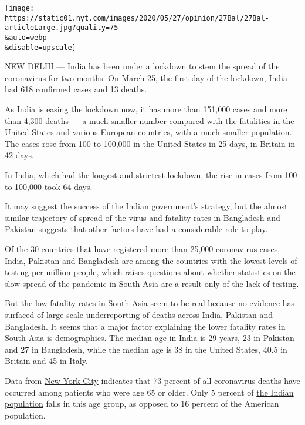 \texttt{[image: https://static01.nyt.com/images/2020/05/27/opinion/27Bal/27Bal-articleLarge.jpg?quality=75\\\&auto=webp\\\&disable=upscale]}

NEW DELHI --- India has been under a lockdown to stem the spread of the
coronavirus for two months. On March 25, the first day of the lockdown,
India had
\href{https://www.thehindu.com/news/national/india-coronavirus-lockdown-day-1-updates-march-25-2020/article31159466.ece}{618
confirmed cases} and 13 deaths.

As India is easing the lockdown now, it has
\href{https://www.livemint.com/news/india/coronavirus-update-covid-19-cases-in-india-surge-to-1-45-lakh-over-6-500-new-cases-in-last-24-hours-11590462824986.html}{more
than 151,000 cases} and more than 4,300 deaths --- a much smaller number
compared with the fatalities in the United States and various European
countries, with a much smaller population. The cases rose from 100 to
100,000 in the United States in 25 days, in Britain in 42 days.

In India, which had the longest and
\href{https://timesofindia.indiatimes.com/india/covid-19-cases-in-india-climbed-to-1-lakh-from-100-in-64-days/articleshow/75820314.cms}{strictest
lockdown}, the rise in cases from 100 to 100,000 took 64 days.

It may suggest the success of the Indian government's strategy, but the
almost similar trajectory of spread of the virus and fatality rates in
Bangladesh and Pakistan suggests that other factors have had a
considerable role to play.

Of the 30 countries that have registered more than 25,000 coronavirus
cases, India, Pakistan and Bangladesh are among the countries with
\href{https://www.worldometers.info/coronavirus/}{the lowest levels of
testing per million} people, which raises questions about whether
statistics on the slow spread of the pandemic in South Asia are a result
only of the lack of testing.

But the low fatality rates in South Asia seem to be real because no
evidence has surfaced of large-scale underreporting of deaths across
India, Pakistan and Bangladesh. It seems that a major factor explaining
the lower fatality rates in South Asia is demographics. The median age
in India is 29 years, 23 in Pakistan and 27 in Bangladesh, while the
median age is 38 in the United States, 40.5 in Britain and 45 in Italy.

Data from
\href{https://www1.nyc.gov/assets/doh/downloads/pdf/imm/covid-19-daily-data-summary-deaths-05132020-1.pdf}{New
York City} indicates that 73 percent of all coronavirus deaths have
occurred among patients who were age 65 or older. Only 5 percent of
\href{https://censusindia.gov.in/vital_statistics/SRS_Report/9Chap\%202\%20-\%202011.pdf}{the
Indian population} falls in this age group, as opposed to 16 percent of
the American population.

